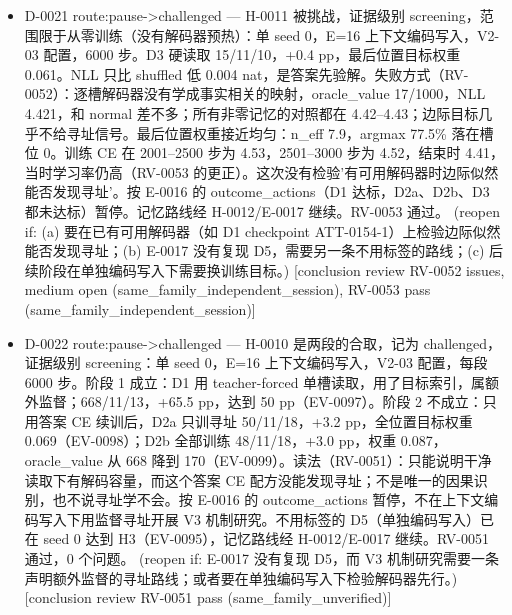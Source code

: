 \documentclass[11pt]{article}
\begin{document}
\begin{itemize}
\item D-0021 route:pause-\textgreater{}challenged --- H-0011 被挑战，证据级别 screening，范围限于从零训练（没有解码器预热）：单 seed 0，E=16 上下文编码写入，V2-03 配置，6000 步。D3 硬读取 15/11/10，+0.4 pp，最后位置目标权重 0.061。NLL 只比 shuffled 低 0.004 nat，是答案先验解。失败方式（RV-0052）：逐槽解码器没有学成事实相关的映射，oracle\_value 17/1000，NLL 4.421，和 normal 差不多；所有非零记忆的对照都在 4.42--4.43；边际目标几乎不给寻址信号。最后位置权重接近均匀：n\_eff 7.9，argmax 77.5\% 落在槽位 0。训练 CE 在 2001--2500 步为 4.53，2501--3000 步为 4.52，结束时 4.41，当时学习率仍高（RV-0053 的更正）。这次没有检验'有可用解码器时边际似然能否发现寻址'。按 E-0016 的 outcome\_actions（D1 达标，D2a、D2b、D3 都未达标）暂停。记忆路线经 H-0012/E-0017 继续。RV-0053 通过。 (reopen if: (a) 要在已有可用解码器（如 D1 checkpoint ATT-0154-1）上检验边际似然能否发现寻址；(b) E-0017 没有复现 D5，需要另一条不用标签的路线；(c) 后续阶段在单独编码写入下需要换训练目标。) [conclusion review RV-0052 issues, medium open (same\_family\_independent\_session), RV-0053 pass (same\_family\_independent\_session)]
\item D-0022 route:pause-\textgreater{}challenged --- H-0010 是两段的合取，记为 challenged，证据级别 screening：单 seed 0，E=16 上下文编码写入，V2-03 配置，每段 6000 步。阶段 1 成立：D1 用 teacher-forced 单槽读取，用了目标索引，属额外监督；668/11/13，+65.5 pp，达到 50 pp（EV-0097）。阶段 2 不成立：只用答案 CE 续训后，D2a 只训寻址 50/11/18，+3.2 pp，全位置目标权重 0.069（EV-0098）；D2b 全部训练 48/11/18，+3.0 pp，权重 0.087，oracle\_value 从 668 降到 170（EV-0099）。读法（RV-0051）：只能说明干净读取下有解码容量，而这个答案 CE 配方没能发现寻址；不是唯一的因果识别，也不说寻址学不会。按 E-0016 的 outcome\_actions 暂停，不在上下文编码写入下用监督寻址开展 V3 机制研究。不用标签的 D5（单独编码写入）已在 seed 0 达到 H3（EV-0095），记忆路线经 H-0012/E-0017 继续。RV-0051 通过，0 个问题。 (reopen if: E-0017 没有复现 D5，而 V3 机制研究需要一条声明额外监督的寻址路线；或者要在单独编码写入下检验解码器先行。) [conclusion review RV-0051 pass (same\_family\_unverified)]

\end{itemize}
\end{document}
